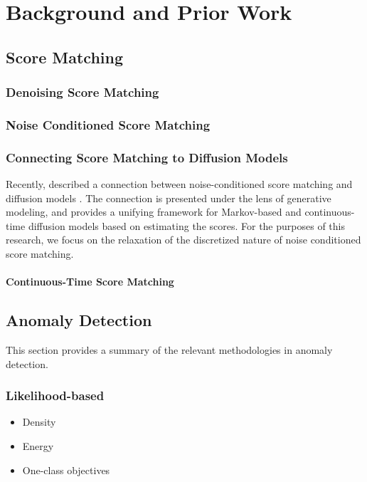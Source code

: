 \chapter{Background and Prior Work}

\section{Score Matching}

\subsection{Denoising Score Matching}

\subsection{Noise Conditioned Score Matching}

\subsection{Connecting Score Matching to Diffusion Models}
Recently,  described a connection between noise-conditioned score matching and diffusion models . The connection is presented under the lens of generative modeling, and provides a unifying framework for Markov-based and continuous-time diffusion models based on estimating the scores. 
For the purposes of this research, we focus on the relaxation of the discretized nature of noise conditioned score matching.

\subsubsection*{Continuous-Time Score Matching}


\section{Anomaly Detection}

This section provides a summary of the relevant methodologies in anomaly detection.

\subsection{Likelihood-based}
\begin{itemize}
    \item Density 
    \item Energy
    \item One-class objectives
\end{itemize}

